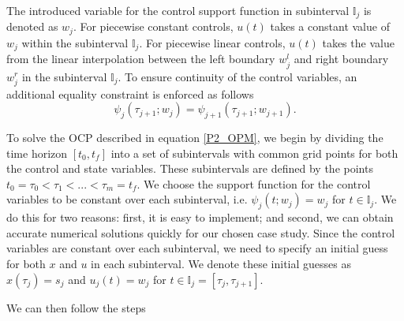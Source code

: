 \documentclass  [
  paper    = a4,
  BCOR     = 10mm,
  twoside,
  fontsize = 12pt,
  fleqn,
  toc      = bibnumbered,
  toc      = listofnumbered,
  numbers  = noendperiod,
  headings = normal,
  listof   = leveldown,
  version  = 3.03
]                                       {scrreprt}
\newcommand{\<}{\langle}
\renewcommand{\>}{\rangle}
\begin{document}
The introduced variable for the control support function in subinterval $\mathbb{I}_j$ is denoted as $w_j$. For piecewise constant controls, $u(t)$ takes a constant value of $w_j$ within the subinterval $\mathbb{I}_j$. For piecewise linear controls, $u(t)$ takes the value from the linear interpolation between the left boundary $w_j^l$ and right boundary $w_j^r$ in the subinterval $\mathbb{I}_j$. To ensure continuity of the control variables, an additional equality constraint is enforced as follows
\begin{equation}
	\psi_j(\tau_{j+1};w_j) =  \psi_{j+1}(\tau_{j+1};w_{j+1}).
\end{equation}

To solve the OCP described in equation \ref{P2_OPM}, we begin by dividing the time horizon $[t_0, t_f]$ into a set of subintervals with common grid points for both the control and state variables. These subintervals are defined by the points $t_0 = \tau_0 < \tau_1 < ... < \tau_m = t_f$. We choose the support function for the control variables to be constant over each subinterval, i.e. $\psi_j(t;w_j) = w_j$ for $t \in \mathbb{I}_j$. We do this for two reasons: first, it is easy to implement; and second, we can obtain accurate numerical solutions quickly for our chosen case study. Since the control variables are constant over each subinterval, we need to specify an initial guess for both $x$ and $u$ in each subinterval. We denote these initial guesses as $x(\tau_j) = s_j$ and $u_j(t) = w_j$ for $t \in \mathbb{I}_j = [\tau_j, \tau_{j+1}]$.

We can then follow the steps
\end{document}

